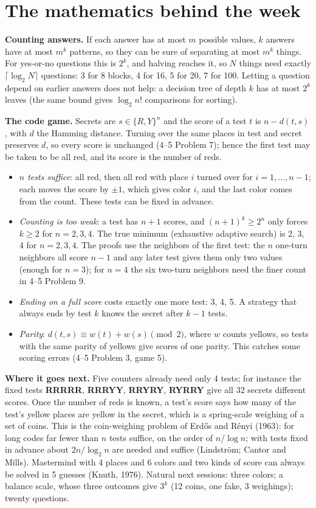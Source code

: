 \documentclass[11pt]{article}
\newcommand{\cd}[1]{\mbox{\textsf{\textbf{#1}}}}   %
\begin{document}
\section{The mathematics behind the week}

\textbf{Counting answers.} If each answer has at most $m$ possible values, $k$ answers have at most $m^k$ patterns, so they can be sure of separating at most $m^k$ things. For yes-or-no questions this is $2^k$, and halving reaches it, so $N$ things need exactly $\lceil\log_2 N\rceil$ questions: 3 for 8 blocks, 4 for 16, 5 for 20, 7 for 100. Letting a question depend on earlier answers does not help: a decision tree of depth $k$ has at most $2^k$ leaves (the same bound gives $\log_2 n!$ comparisons for sorting).

\textbf{The code game.} Secrets are $s\in\{R,Y\}^n$ and the score of a test $t$ is $n-d(t,s)$, with $d$ the Hamming distance. Turning over the same places in test and secret preserves $d$, so every score is unchanged (4--5 Problem 7); hence the first test may be taken to be all red, and its score is the number of reds.
\begin{itemize}
\item \emph{$n$ tests suffice}: all red, then all red with place $i$ turned over for $i=1,\dots,n-1$; each moves the score by $\pm1$, which gives color $i$, and the last color comes from the count. These tests can be fixed in advance.
\item \emph{Counting is too weak}: a test has $n+1$ scores, and $(n+1)^k\ge 2^n$ only forces $k\ge2$ for $n=2,3,4$. The true minimum (exhaustive adaptive search) is 2, 3, 4 for $n=2,3,4$. The proofs use the neighbors of the first test: the $n$ one-turn neighbors all score $n-1$ and any later test gives them only two values (enough for $n=3$); for $n=4$ the six two-turn neighbors need the finer count in 4--5 Problem 9.
\item \emph{Ending on a full score} costs exactly one more test: 3, 4, 5. A strategy that always ends by test $k$ knows the secret after $k-1$ tests.
\item \emph{Parity}: $d(t,s)\equiv w(t)+w(s) \pmod 2$, where $w$ counts yellows, so tests with the same parity of yellows give scores of one parity. This catches some scoring errors (4--5 Problem 3, game 5).
\end{itemize}

\textbf{Where it goes next.} Five counters already need only 4 tests; for instance the fixed tests \cd{RRRRR}, \cd{RRRYY}, \cd{RRYRY}, \cd{RYRRY} give all 32 secrets different scores. Once the number of reds is known, a test's score says how many of the test's yellow places are yellow in the secret, which is a spring-scale weighing of a set of coins. This is the coin-weighing problem of Erdős and Rényi (1963): for long codes far fewer than $n$ tests suffice, on the order of $n/\log n$; with tests fixed in advance about $2n/\log_2 n$ are needed and suffice (Lindström; Cantor and Mills). Mastermind with 4 places and 6 colors and two kinds of score can always be solved in 5 guesses (Knuth, 1976). Natural next sessions: three colors; a balance scale, whose three outcomes give $3^k$ (12 coins, one fake, 3 weighings); twenty questions.
\end{document}

